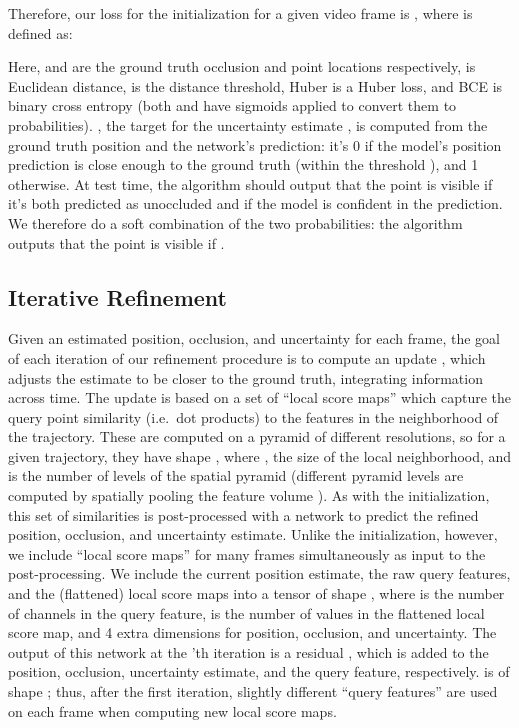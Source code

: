 \documentclass[10pt,twocolumn,letterpaper]{article}
\begin{document}
Therefore, our loss for the initialization for a given video frame  is , where  is defined as:



Here,  and  are the ground truth occlusion and point locations respectively,  is Euclidean distance,  is the distance threshold, Huber is a Huber loss, and BCE is binary cross entropy (both  and  have sigmoids applied to convert them to probabilities).  , the target for the uncertainty estimate , is computed from the ground truth position and the network's prediction: it's 0 if the model's position prediction is close enough to the ground truth (within the threshold ), and 1 otherwise.  At test time, the algorithm should output that the point is visible if it's both predicted as unoccluded and if the model is confident in the prediction.  We therefore do a soft combination of the two probabilities: the algorithm outputs that the point is visible if .

\subsection{Iterative Refinement}

Given an estimated position, occlusion, and uncertainty for each frame, the goal of each iteration  of our refinement procedure is to compute an update , which adjusts the estimate to be closer to the ground truth, integrating information across time.  The update is based on a set of ``local score maps'' which capture the query point similarity (i.e.\ dot products) to the features in the neighborhood of the trajectory.  These are computed on a pyramid of different resolutions, so for a given trajectory, they have shape , where , the size of the local neighborhood, and  is the number of levels of the spatial pyramid (different pyramid levels are computed by spatially pooling the feature volume ).  As with the initialization, this set of similarities is post-processed with a network to predict the refined position, occlusion, and uncertainty estimate.  Unlike the initialization, however, we include ``local score maps'' for many frames simultaneously as input to the post-processing.  We include the current position estimate, the raw query features, and the (flattened) local score maps into a tensor of shape , where  is the number of channels in the query feature,  is the number of values in the flattened local score map, and 4 extra dimensions for position, occlusion, and uncertainty.  The output of this network at the 'th iteration is a residual , which is added to the position, occlusion, uncertainty estimate, and the query feature, respectively.  is of shape ; thus, after the first iteration, slightly different ``query features'' are used on each frame when computing new local score maps. 
\end{document}
